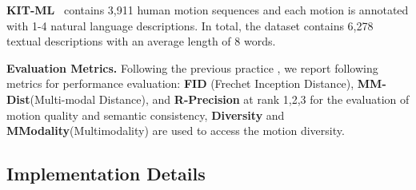 \documentclass[letterpaper]{article} \usepackage{aaai24}
\begin{document}
\noindent\textbf{KIT-ML}~\cite{Plappert_2016} contains 3,911 human motion sequences and each motion is annotated with 1-4 natural language descriptions. In total, the dataset contains 6,278 textual descriptions with an average length of 8 words.







\noindent\textbf{Evaluation Metrics.} Following the previous practice \cite{guo2022generating}, we report following metrics for performance evaluation: \textbf{FID} (Frechet Inception Distance),  \textbf{MM-Dist}(Multi-modal Distance), and \textbf{R-Precision} at rank 1,2,3 for the  evaluation of motion quality and semantic consistency,  \textbf{Diversity} and  \textbf{MModality}(Multimodality) are used to access the motion diversity.

\iffalse
\begin{itemize}
\item \textbf{Frechet Inception Distance} (\textbf{FID}) evaluates the distribution distance of the feature space between the generated motions and the real motions. This is the primary metric representing the quality of the generated motion.
\item \textbf{Multi-modal Distance} (\textbf{MM-Dist}) evaluates the average Euclidean distance between the generated motion and the given text description in latent space, which measure the text-motion consistency.
\item \textbf{R-Precision} calculates the Top-1/2/3 matching accuracy within 32 pairs of motion and text in latent space.
    
\item \textbf{Diversity} calculates the average Euclidean distance of motion features within a test batch.
\item \textbf{Multimodality} (\textbf{MModality}) calculate the average Euclidean distance of motions features within the same text.
\end{itemize} 
\fi












\subsection{Implementation Details} 
\end{document}
